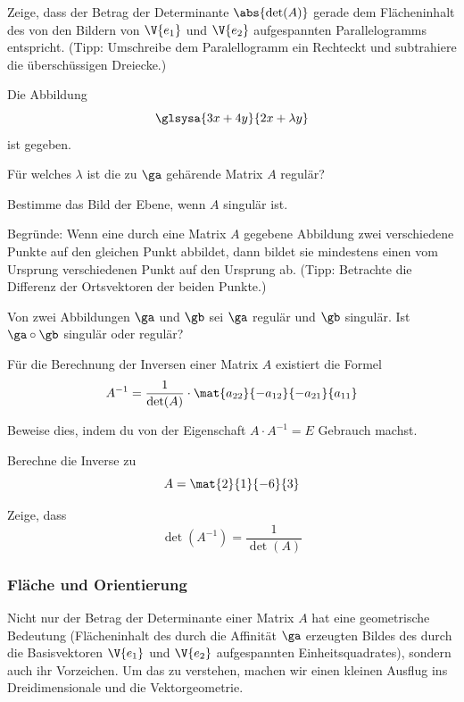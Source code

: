 \documentclass[%
11pt,%
twoside,%
titlepage,%
german,%
headsepline%
]{scrartcl}
\begin{document}
\begin{ueb}
Zeige, dass der Betrag der Determinante $\abs{\det(A)}$ gerade dem Flächeninhalt des von den Bildern von $\V{e_1}$ und $\V{e_2}$ aufgespannten Parallelogramms entspricht. (Tipp: Umschreibe dem Paralellogramm ein Rechteckt und subtrahiere die überschüssigen Dreiecke.)
\end{ueb}

\begin{ueb}
Die Abbildung
$$\glsysa{3x+4y}{2x+\lambda y}$$
ist gegeben.
\begin{enumeratea}
\item Für welches $\lambda$ ist die zu $\ga$ gehärende Matrix $A$ regulär?
\item Bestimme das Bild der Ebene, wenn $A$ singulär ist.
\item Begründe: Wenn eine durch eine Matrix $A$ gegebene Abbildung zwei verschiedene Punkte auf den gleichen Punkt abbildet, dann bildet sie mindestens einen vom Ursprung verschiedenen Punkt auf den Ursprung ab.
(Tipp: Betrachte die Differenz der Ortsvektoren der beiden Punkte.)
\end{enumeratea}
\end{ueb}

\begin{ueb}
Von zwei Abbildungen $\ga$ und $\gb$ sei $\ga$ regulär und $\gb$ singulär. Ist $\ga\circ\gb$ singulär oder regulär?
\end{ueb}

\begin{ueb}
Für die Berechnung der Inversen einer Matrix $A$ existiert die Formel
$$A^{-1}=\frac{1}{\det(A)}\cdot\mat{a_{22}}{-a_{12}}{-a_{21}}{a_{11}}$$
\begin{enumeratea}
\item Beweise dies, indem du von der Eigenschaft $A\cdot A^{-1}=E$ Gebrauch machst.
\item Berechne die Inverse zu
$$A=\mat{2}{1}{-6}{3}$$
\item Zeige, dass
$$\det(A^{-1})=\frac{1}{\det(A)}$$
\end{enumeratea}

\end{ueb}

\subsubsection{Fläche und Orientierung}
Nicht nur der Betrag der Determinante einer Matrix $A$ hat eine geometrische Bedeutung (Flächeninhalt des durch die Affinität $\ga$ erzeugten Bildes des durch die Basisvektoren $\V{e_1}$ und $\V{e_2}$ aufgespannten Einheitsquadrates), sondern auch ihr Vorzeichen. Um das zu verstehen, machen wir einen kleinen Ausflug ins Dreidimensionale und die Vektorgeometrie.
\end{document}
